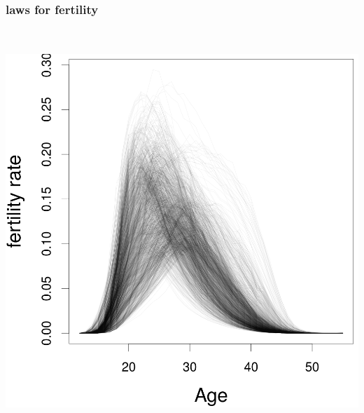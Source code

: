\documentclass[20pt]{beamer}
\begin{document}
\begin{frame}
\frametitle{laws for fertility}
\vspace{-1em}
\begin{center}
\includegraphics[height=6in]{Figures/Fertility1.png}
\end{center}
\end{frame}
\end{document}
